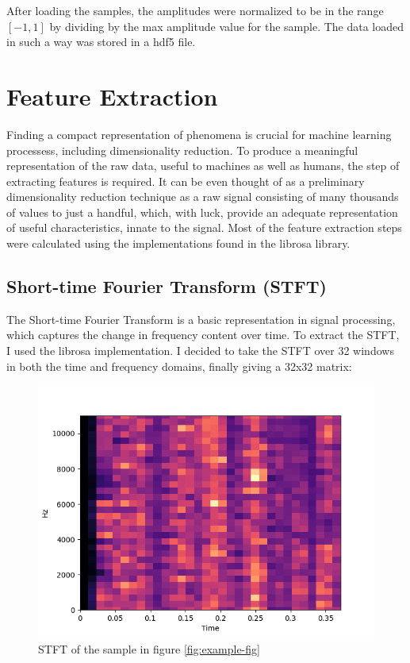 \documentclass[a4paper, 12pt, twoside]{report}
\begin{document}
After loading the samples, the amplitudes were normalized to be in the range \([-1, 1]\) by dividing by the max amplitude value for the sample. The data loaded in such a way was stored in a hdf5 file.

\section{Feature Extraction}
\label{sec:org8d85bd5}

Finding a compact representation of phenomena is crucial for machine learning processess, including dimensionality reduction. To produce a meaningful representation of the raw data, useful to machines as well as humans, the step of extracting features is required. It can be even thought of as a preliminary dimensionality reduction technique as a raw signal consisting of many thousands of values to just a handful, which, with luck, provide an adequate representation of useful characteristics, innate to the signal. Most of the feature extraction steps were calculated using the implementations found in the librosa library.


\subsection{Short-time Fourier Transform (STFT)}
\label{sec:org0c9e9c5}

The Short-time Fourier Transform is a basic representation in signal processing, which captures the change in frequency content over time.
To extract the STFT, I used the librosa implementation. I decided to take the STFT over 32 windows in both the time and frequency domains, finally giving a 32x32 matrix:

\begin{figure}[h!]
\centering
\includegraphics[width=.7\linewidth]{./Figures/stft.png}
\caption{STFT of the sample in figure \ref{fig:example-fig}}
\end{figure}
\end{document}

